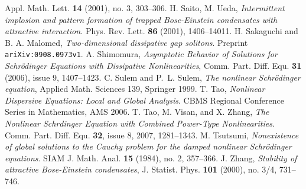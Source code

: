 \documentclass[a4paper,leqno]{amsart}
\theoremstyle{plain}
\theoremstyle{definition}
\numberwithin{equation}{section}
\begin{document}
\begin{thebibliography}{amsplain}
Appl. Math. Lett. {\bf 14} (2001), no. 3, 303--306.
 H. Saito, M. Ueda, \emph{Intermittent implosion and pattern formation of trapped Bose-Einstein condensates with attractive interaction.} Phys. Rev. Lett. {\bf 86} (2001), 1406--14011.
 H. Sakaguchi and B. A. Malomed, \emph{Two-dimensional dissipative gap solitons}. Preprint {\tt ariXiv:0908.0973v1}.
 A. Shimomura, \emph{Asymptotic Behavior of Solutions for Schr\"odinger Equations with Dissipative Nonlinearities}, Comm. Part. Diff. Equ.  {\bf 31} (2006), issue 9, 1407--1423.
 C. Sulem and P.~L. Sulem, \emph{The nonlinear Schr\"odinger equation},
Applied Math. Sciences 139, Springer 1999.
 T. Tao, \emph{Nonlinear Dispersive Equations: Local and Global Analysis}.
CBMS Regional Conference Series in Mathematics, AMS 2006.
 T. Tao, M. Visan, and X. Zhang, \emph{The Nonlinear Schrdinger Equation with Combined Power-Type Nonlinearities}. Comm. Part. Diff. Equ. {\bf 32}, issue 8, 2007, 1281--1343.
 M. Tsutsumi, \emph{Nonexistence of global solutions to the Cauchy problem for the damped nonlinear Schr\"odinger equations}.
SIAM J. Math. Anal. {\bf 15} (1984), no. 2, 357--366.
 J. Zhang, \emph{Stability of attractive Bose-Einstein condensates}, J. Statist. Phys. {\bf 101} (2000), no. 3/4, 731--746.
\end{thebibliography}
\end{document}
